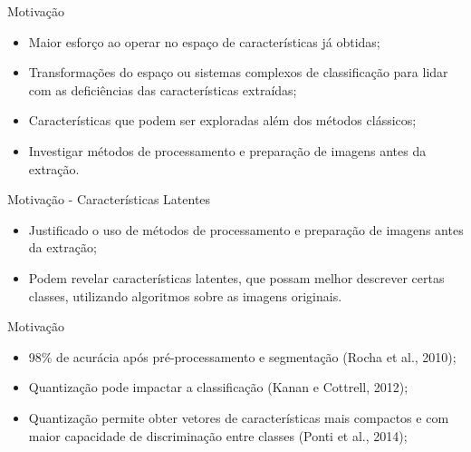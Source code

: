 \documentclass{beamer}
\begin{document}
\begin{frame}{Motivação}
\setlength\leftmargini{0em}
\justifying
\begin{itemize}
\item Maior esforço ao operar no espaço de características já obtidas;
\item Transformações do espaço ou sistemas complexos de classificação para lidar com as deficiências das características extraídas;
\item Características que podem ser exploradas além dos métodos clássicos;
\item Investigar métodos de processamento e preparação de imagens antes da extração.
\end{itemize}
\end{frame}
\begin{frame}{Motivação - Características Latentes}
\setlength\leftmargini{0em}
\justifying
{}
\begin{itemize}
\item Justificado o uso de métodos de processamento e preparação de imagens antes da extração;
\item Podem revelar características latentes, que possam melhor descrever certas classes, utilizando algoritmos sobre as imagens originais.
\end{itemize}
\end{frame}
\begin{frame}{Motivação}
\setlength\leftmargini{0em}
\justifying
  \begin{itemize}
\justifying
    \item 98\% de acurácia após pré-processamento e segmentação (Rocha et al., 2010); %
    \item Quantização pode impactar a classificação (Kanan e Cottrell, 2012);
    \item Quantização permite obter vetores de características mais compactos e com maior capacidade de discriminação entre classes (Ponti et al., 2014);
  \end{itemize}
\end{frame}
\end{document}
